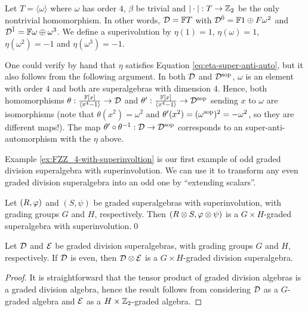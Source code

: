 \documentclass{amsbook}
\begin{document}
\begin{ex}\label{ex:FZZ_4-with-superinvoltion}
    Let $T= \langle \omega \rangle$ where $\omega$ has order $4$, $\beta$ be trivial and $| \cdot |: T \to \mathbb{Z}_2$ be the only nontrivial homomorphism. In other words, $\mathcal{D} = \mathbb{F} T$ with $\mathcal{D}^{\bar0} = \mathbb{F} 1 \oplus F \omega^2$ and $\mathcal{D}^{\bar1} = \mathbb{F} \omega \oplus \omega^3$. We define a superivolution by $\eta (1) = 1$, $\eta (\omega) = 1$, $\eta (\omega^2) = -1$ and $\eta(\omega^3) = -1$. %
    
    One could verify by hand that $\eta$ satisfies Equation \eqref{eq:eta-super-anti-auto}, but it also follows from the following argument. In both $\mathcal{D}$ and $\mathcal{D}^{\mathrm{sop}}$, $\omega$ is an element with order $4$ and both are superalgebras with dimension $4$. Hence, both homomorphisms $\theta: \frac{\mathbb{F}[x]}{\langle x^4 - 1 \rangle} \to \mathcal{D}$ and $\theta': \frac{\mathbb{F}[x]}{\langle x^4 - 1 \rangle} \to \mathcal{D}^{\mathrm{sop}}$ sending $x$ to $\omega$ are isomorphisms (note that $\theta(x^2) = \omega^2$ and $\theta'(x^2) = (\omega^{\mathrm{sop}})^2 = - \omega^2$, so they are different maps!). The map $\theta'\circ \theta^{-1}: \mathcal{D} \to \mathcal{D}^{\mathrm{sop}}$ corresponds to an super-anti-automorphism with the $\eta$ above.
\end{ex}

Example \ref{ex:FZZ_4-with-superinvoltion} is our first example of odd graded division superalgebra with superinvolution. We can use it to transform any even graded division superalgebra into an odd one by ``extending scalars''.

\begin{lemma}
    Let $(R, \varphi)$ and $(S, \psi)$ be graded superalgebras with superinvolution, with grading groups $G$ and $H$, respectively. Then $(R\otimes S, \varphi\otimes \psi)$ is a $G\times H$-graded superalgebra with superinvolution.\qed
\end{lemma}

\begin{lemma}
    Let $\mathcal{D}$ and $\mathcal E$ be graded division superalgebras, with grading groups $G$ and $H$, respectively. If $\mathcal{D}$ is even, then $\mathcal{D} \otimes \mathcal E$ is a $G\times H$-graded division superalgebra.
\end{lemma}

\begin{proof}
    It is straightforward that the tensor product of graded division algebras is a graded division algebra, hence the result follows from considering $\mathcal{D}$ as a $G$-graded algebra and $\mathcal E$ as a $H\times \mathbb{Z}_2$-graded algebra.
\end{proof}
\end{document}
